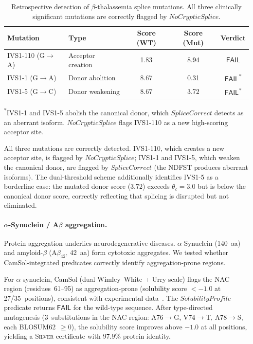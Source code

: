 \documentclass[acmsmall,review,anonymous]{acmart}
\newcommand{\FAIL}{\ensuremath{\mathsf{FAIL}}\xspace}
\newcommand{\SILVER}{\textsc{Silver}\xspace}
\begin{document}
\begin{table}[t]
\centering
\caption{Retrospective detection of $\beta$-thalassemia splice
         mutations.  All three clinically significant mutations are
         correctly flagged by $\mathit{NoCrypticSplice}$.}
\label{tab:thal}
\begin{tabular}{llccc}
\toprule
\textbf{Mutation} & \textbf{Type} & \textbf{Score (WT)} &
  \textbf{Score (Mut)} & \textbf{Verdict} \\
\midrule
IVS1-110 (G$\to$A) & Acceptor creation & 1.83 & 8.94 & \FAIL \\
IVS1-1   (G$\to$A) & Donor abolition   & 8.67 & 0.31 & \FAIL\textsuperscript{*} \\
IVS1-5   (G$\to$C) & Donor weakening   & 8.67 & 3.72 & \FAIL\textsuperscript{*} \\
\bottomrule
\end{tabular}
\vspace{2pt}

{\scriptsize \textsuperscript{*}IVS1-1 and IVS1-5 abolish the canonical
donor, which $\mathit{SpliceCorrect}$ detects as an aberrant isoform.
$\mathit{NoCrypticSplice}$ flags IVS1-110 as a new high-scoring
acceptor site.}
\end{table}

All three mutations are correctly detected.  IVS1-110, which creates a
new acceptor site, is flagged by $\mathit{NoCrypticSplice}$; IVS1-1 and
IVS1-5, which weaken the canonical donor, are flagged by
$\mathit{SpliceCorrect}$ (the NDFST produces aberrant isoforms).  The
dual-threshold scheme additionally identifies IVS1-5 as a borderline
case: the mutated donor score (3.72) exceeds $\theta_c = 3.0$ but is
below the canonical donor score, correctly reflecting that splicing is
disrupted but not eliminated.

\paragraph{$\alpha$-Synuclein / A$\beta$ aggregation.}
Protein aggregation underlies neurodegenerative diseases.
$\alpha$-Synuclein (140~aa) and amyloid-$\beta$ (A$\beta_{42}$, 42~aa)
form cytotoxic aggregates.  We tested whether CamSol-integrated
predicates correctly identify aggregation-prone regions.

For $\alpha$-synuclein, CamSol (dual Wimley--White + Urry scale) flags
the NAC region (residues~61--95) as aggregation-prone (solubility score
$< -1.0$ at 27/35~positions), consistent with experimental
data~\cite{giasson2002nacfibrillization}.  The
$\mathit{SolubilityProfile}$ predicate returns \FAIL{} for the wild-type
sequence.  After type-directed mutagenesis (3~substitutions in the NAC
region: A76$\to$G, V74$\to$T, A78$\to$S, each BLOSUM62~$\ge 0$), the
solubility score improves above $-1.0$ at all positions, yielding a
\SILVER{} certificate with 97.9\% protein identity.
\end{document}
